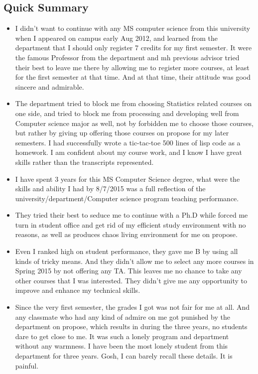 \documentclass[9pt,b5paper]{article}
\begin{document}
\subsection{Quick Summary}
\label{sec-5-2}
\begin{itemize}
\item I didn't want to continue with any MS computer science from this university when I appeared on campus early Aug 2012, and learned from the department that I should only register 7 credits for my first semester. It were the famous Professor from the department and mh previous advisor tried their best to leave me there by allowing me to register more courses, at least for the first semester at that time. And at that time, their attitude was good sincere and admirable.
\item The department tried to block me from choosing Statistics related courses on one side, and tried to block me from processing and developing well from Computer science major as well, not by forbidden me to choose those courses, but rather by giving up offering those courses on propose for my later semesters. I had successfully wrote a tic-tac-toe 500 lines of lisp code as a homework. I am confident about my course work, and I know I have great skills rather than the transcripts represented.
\item I have spent 3 years for this MS Computer Science degree, what were the skills and ability I had by 8/7/2015 was a full reflection of the university/department/Computer science program teaching performance.
\item They tried their best to seduce me to continue with a Ph.D while forced me turn in student office and get rid of my efficient study environment with no reasons, as well as produces chaos living environment for me on propose.
\item Even I ranked high on student performance, they gave me B by using all kinds of tricky means. And they didn't allow me to select any more courses in Spring 2015 by not offering any TA. This leaves me no chance to take any other courses that I was interested. They didn't give me any opportunity to improve and enhance my technical skills.
\item Since the very first semester, the grades I got was not fair for me at all. And any classmate who had any kind of admire on me got punished by the department on propose, which results in during the three years, no students dare to get close to me. It was such a lonely program and department without any warmness. I have been the most lonely student from this department for three years. Gosh, I can barely recall these details. It is painful.

\end{itemize}
\end{document}
